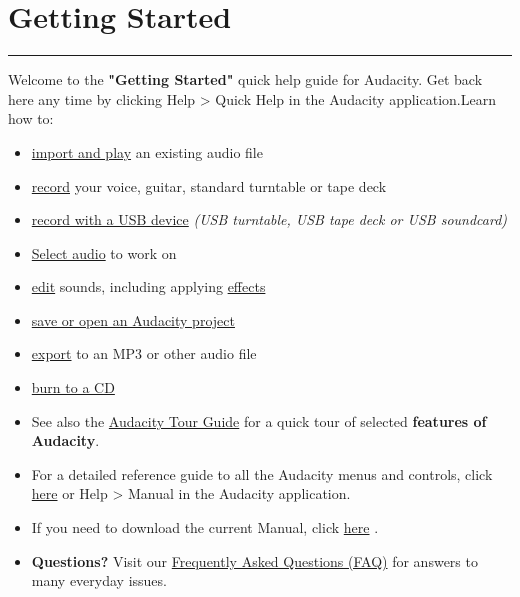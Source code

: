 \label{quickXhelpX}
\ensurespace\section{Getting Started}
\par\vspace{1mm}\hrule
\begin{multicols}{2}Welcome to the \textbf{"Getting Started"} quick help guide for Audacity. Get back here any time by clicking Help > Quick Help in the Audacity application.Learn how to:

\begin{itemize}
\item 
\hyperref[\foo{manXplayX}]{ import and play}
 an existing audio file 
\item 
\hyperref[\foo{manXrecordX}]{ record}
 your voice, guitar, standard turntable or tape deck
\item 
\hyperref[\foo{manXusbXrecordingX}]{ record with a USB device}
\textit{(USB turntable, USB tape deck or USB soundcard)}
\item 
\hyperref[\foo{manXselectingXaudioXtheXbasicsX}]{Select audio}
 to work on
\item 
\hyperref[\foo{manXeditX}]{ edit}
 sounds, including applying 
\hyperref[\foo{manXeffectXmenuX}]{effects}

\item 
\hyperref[\foo{manXsavingX}]{ save or open an Audacity project}

\item 
\hyperref[\foo{manXexportX}]{ export}
 to an MP3 or other audio file
\item 
\hyperref[\foo{manXburncdX}]{ burn to a CD}

\end{itemize}

\begin{itemize}
\item  See also the 
\hyperref[\foo{manXaudacityXtourXguideX}]{Audacity Tour Guide}
 for a quick tour of selected \textbf{features of Audacity}. 
\item  For a detailed reference guide to all the Audacity menus and controls, click 
\hyperref[\foo{indexXreference}]{here}
 or Help > Manual in the Audacity application. 
\item  If you need to download the current Manual, click 
\hyperref[\foo{manXunzippingXtheXmanualX}]{here}
.
\item \textbf{Questions?} Visit our 
\hyperref[\foo{manXfaqX}]{Frequently Asked Questions (FAQ)}
 for answers to many everyday issues.  
\end{itemize}
\end{multicols}